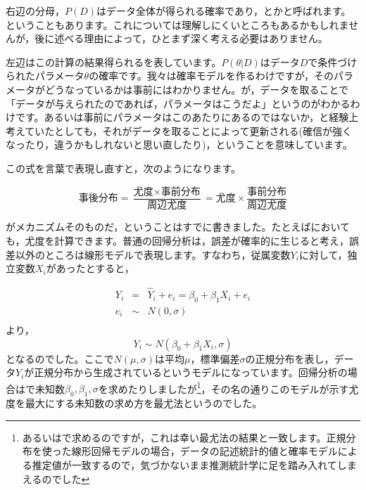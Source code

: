 \documentclass{ltjsbook}
\begin{document}
右辺の分母，$P(D)$はデータ全体が得られる確率であり，とかと呼ばれます。ということもあります。これについては理解しにくいところもあるかもしれませんが，後に述べる理由によって，ひとまず深く考える必要はありません。

左辺はこの計算の結果得られるを表しています。$P(\theta|D)$はデータ$D$で条件づけられたパラメータ$\theta$の確率です。我々は確率モデルを作るわけですが，そのパラメータがどうなっているかは事前にはわかりません。が，データを取ることで「データが与えられたのであれば，パラメータはこうだよ」というのがわかるわけです。あるいは事前にパラメータはこのあたりにあるのではないか，と経験上考えていたとしても，それがデータを取ることによって更新される(確信が強くなったり，違うかもしれないと思い直したり)，ということを意味しています。

この式を言葉で表現し直すと，次のようになります。

$$ \mbox{事後分布} = \frac{\mbox{尤度}\times \mbox{事前分布}}{\mbox{周辺尤度}} = \mbox{尤度} \times \frac{事前分布}{周辺尤度}$$

がメカニズムそのものだ，ということはすでに書きました。たとえばにおいても，尤度を計算できます。普通の回帰分析は，誤差が確率的に生じると考え，誤差以外のところは線形モデルで表現します。すなわち，従属変数$Y_i$に対して，独立変数$X_i$があったとすると，

\begin{equation*}
	\begin{array}{lll}
		Y_i & =    & \hat{Y}_i + e_i = \beta_0 + \beta_1 X_i + e_i \\
		e_i & \sim & N(0,\sigma)                                   \\
	\end{array}
\end{equation*}
より，
$$ Y_i \sim N(\beta_0 + \beta_1 X_i, \sigma) $$
となるのでした。ここで$N(\mu,\sigma)$は平均$\mu$，標準偏差$\sigma$の正規分布を表し，データ$Y_i$が正規分布から生成されているというモデルになっています。回帰分析の場合はで未知数$\beta_0,\beta_1,\sigma$を求めたりしましたが\footnote{あるいはで求めるのですが，これは幸い最尤法の結果と一致します。正規分布を使った線形回帰モデルの場合，データの記述統計的値と確率モデルによる推定値が一致するので，気づかないまま推測統計学に足を踏み入れてしまえるのでした}，その名の通りこのモデルが示す尤度を最大にする未知数の求め方を最尤法というのでした。
\end{document}
